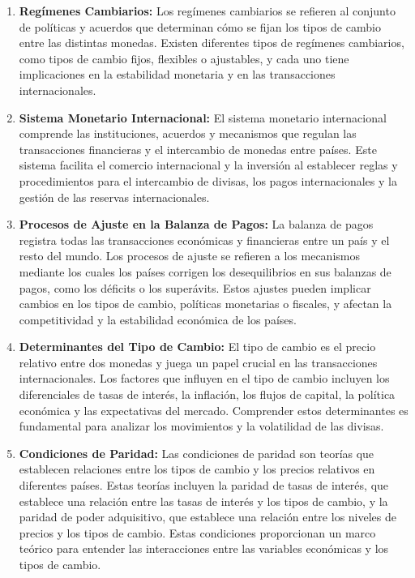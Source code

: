 \documentclass[
  jou,
  floatsintext,
  longtable,
  a4paper,
  nolmodern,
  notxfonts,
  notimes,
  12pt,
  colorlinks=true,linkcolor=blue,citecolor=blue,urlcolor=blue]{apa7}
\begin{document}
\begin{enumerate}
\def\labelenumi{\arabic{enumi}.}
\item
  \textbf{Regímenes Cambiarios:} Los regímenes cambiarios se refieren al
  conjunto de políticas y acuerdos que determinan cómo se fijan los
  tipos de cambio entre las distintas monedas. Existen diferentes tipos
  de regímenes cambiarios, como tipos de cambio fijos, flexibles o
  ajustables, y cada uno tiene implicaciones en la estabilidad monetaria
  y en las transacciones internacionales.
\item
  \textbf{Sistema Monetario Internacional:} El sistema monetario
  internacional comprende las instituciones, acuerdos y mecanismos que
  regulan las transacciones financieras y el intercambio de monedas
  entre países. Este sistema facilita el comercio internacional y la
  inversión al establecer reglas y procedimientos para el intercambio de
  divisas, los pagos internacionales y la gestión de las reservas
  internacionales.
\item
  \textbf{Procesos de Ajuste en la Balanza de Pagos:} La balanza de
  pagos registra todas las transacciones económicas y financieras entre
  un país y el resto del mundo. Los procesos de ajuste se refieren a los
  mecanismos mediante los cuales los países corrigen los desequilibrios
  en sus balanzas de pagos, como los déficits o los superávits. Estos
  ajustes pueden implicar cambios en los tipos de cambio, políticas
  monetarias o fiscales, y afectan la competitividad y la estabilidad
  económica de los países.
\item
  \textbf{Determinantes del Tipo de Cambio:} El tipo de cambio es el
  precio relativo entre dos monedas y juega un papel crucial en las
  transacciones internacionales. Los factores que influyen en el tipo de
  cambio incluyen los diferenciales de tasas de interés, la inflación,
  los flujos de capital, la política económica y las expectativas del
  mercado. Comprender estos determinantes es fundamental para analizar
  los movimientos y la volatilidad de las divisas.
\item
  \textbf{Condiciones de Paridad:} Las condiciones de paridad son
  teorías que establecen relaciones entre los tipos de cambio y los
  precios relativos en diferentes países. Estas teorías incluyen la
  paridad de tasas de interés, que establece una relación entre las
  tasas de interés y los tipos de cambio, y la paridad de poder
  adquisitivo, que establece una relación entre los niveles de precios y
  los tipos de cambio. Estas condiciones proporcionan un marco teórico
  para entender las interacciones entre las variables económicas y los
  tipos de cambio.
\end{enumerate}
\end{document}
